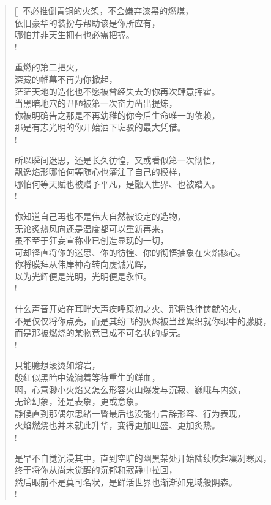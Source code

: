 \documentclass[UTF8, 12pt, a4paper]{ctexrep} %
\begin{document}
\begin{verse}[\versewidth]
不必推倒青铜的火架，不会嫌弃漆黑的燃煤，\\
依旧豪华的装扮与帮助该是你所应有，\\
哪怕并非天生拥有也必需把握。\\!

重燃的第二把火，\\
深藏的帷幕不再为你掀起，\\
茫茫天地的造化也不愿被曾经失去的你再次肆意挥霍。\\
当黑暗地穴的丑陋被第一次奋力凿出提炼，\\
你被明确告之那是不再幼稚的你今后生命唯一的依赖，\\
那是有志光明的你开始洒下斑驳的最大凭借。\\!

所以瞬间迷思，还是长久彷惶，又或看似第一次彻悟，\\
飘逸焰形哪怕何等随心也灌注了自己的模样，\\
哪怕何等天赋也被赠予平凡，是融入世界、也被踏入。\\!

你知道自己再也不是伟大自然被设定的造物，\\
无论炙热风向还是温度都可以重新再来，\\
虽不至于狂妄宣称业已创造显现的一切，\\
可却径直将你的迷思、你的彷惶、你的彻悟抽象在火焰核心。\\
你将膜拜从伟岸神奇转向虔诚光辉，\\
以为光辉便是光明，光明便是永恒。\\!

什么声音开始在耳畔大声疾呼原初之火、那将铁律铸就的火，\\
不是仅仅将你点亮，而是其纷飞的灰烬被当丝絮织就你眼中的朦胧，\\
而是那被燃烧的某物竟已成不可名状的虚无。\\!

只能臆想滚烫如熔岩，\\
殷红似黑暗中流淌着等待重生的鲜血，\\
啊，心意渺小火焰又怎么形容火山爆发与沉寂、巍峨与内敛，\\
无论幻象，还是表象，更或意象。\\
静候直到那偶尔思绪一瞥最后也没能有言辞形容、行为表现，\\
火焰燃烧也并未就此升华，变得更加旺盛、更加炙热。\\!

是早不自觉沉浸其中，直到空旷的幽黑某处开始陆续吹起凜冽寒风，\\
终于将你从尚未觉醒的沉郁和寂静中拉回，\\
然后眼前不是莫可名状，是鲜活世界也渐渐如鬼域般阴森。\\!


\end{verse}
\end{document}
